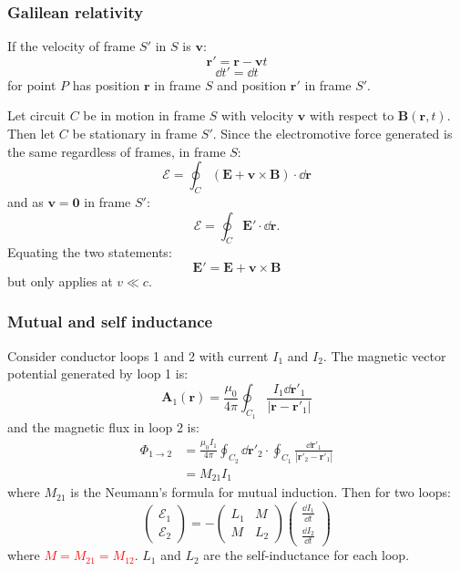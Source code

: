 \documentclass{article}
\newcommand{\vc}[1]{\boldsymbol{#1}}
\begin{document}
\begin{multicols*}{3}
\subsubsection*{Galilean relativity}
If the velocity of frame $S'$ in $S$ is $\vc{v}$:
$$\vc{r'}=\vc{r}-\vc{v}t$$
$$\dd t'=\dd t$$
for point $P$ has position $\vc{r}$ in frame $S$
and position $\vc{r}'$ in frame $S'$.

Let circuit $C$ be in motion in frame $S$
with velocity $\vc{v}$ with respect to $\vc{B}(\vc{r},t)$.
Then let $C$ be stationary in frame $S'$.
Since the electromotive force generated is the same
regardless of frames, in frame $S$:
$$\mathcal{E}=\oint_C(\vc{E}+\vc{v}\times\vc{B})\cdot\dd\vc{r}$$
and as $\vc{v}=\vc{0}$ in frame $S'$:
$$\mathcal{E}=\oint_C\vc{E}'\cdot\dd\vc{r}.$$
Equating the two statements:
$$\vc{E}'=\vc{E}+\vc{v}\times\vc{B}$$
but only applies at $v\ll c$.

\subsubsection*{Mutual and self inductance}
Consider conductor loops 1 and 2 with
current $I_1$ and $I_2$.
The magnetic vector potential generated by loop 1 is:
$$\vc{A}_1(\vc{r})=\frac{\mu_0}{4\pi}\oint_{C_1}
\frac{I_1\dd\vc{r}'_1}{|\vc{r}-\vc{r}'_1|}$$
and the magnetic flux in loop 2 is:
\begin{align*}
    \Phi_{1\rightarrow2}
    &=\frac{\mu_0 I_1}{4\pi}\oint_{C_2}\dd\vc{r}'_2
    \cdot\oint_{C_1}\frac{\dd\vc{r}'_1}{|\vc{r}'_2-\vc{r}'_1|} \\
    &=M_{21}I_1
\end{align*}
where $M_{21}$ is the Neumann's formula for mutual induction.
Then for two loops:
$$\begin{pmatrix}\mathcal{E}_1 \\ \mathcal{E}_2\end{pmatrix}=
-\begin{pmatrix}L_1 & M \\ M & L_2\end{pmatrix}
\begin{pmatrix}\frac{\dd I_1}{\dd t}
\\[0.2em] \frac{\dd I_2}{\dd t}\end{pmatrix}$$
where \textcolor{red}{$M=M_{21}=M_{12}$}.
$L_1$ and $L_2$ are the self-inductance for each loop.


\end{multicols*}
\end{document}
